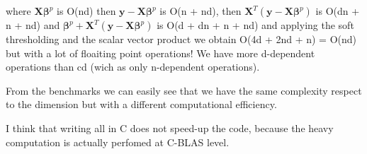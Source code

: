 \documentclass[a4paper,10pt]{article}
\newcommand{\bbeta}{\boldsymbol{\beta}}
\newcommand{\X}{\mathbf{X}}
\newcommand{\y}{\mathbf{y}}
\begin{document}
where $\X\bbeta^p$ is O(nd) then $\y - \X\bbeta^p$ is O(n + nd), 
then $\X^T(\y - \X\bbeta^p)$ is O(dn + n + nd) and 
$\bbeta^p + \X^T(\y - \X\bbeta^p)$ is O(d + dn + n + nd) and
applying the soft thresholding and the scalar vector product 
we obtain O(4d + 2nd + n) = O(nd) but with a lot of floaiting point
operations!
We have more d-dependent operations than cd (wich as only 
n-dependent operations).

From the benchmarks we can easily see that we have the same
complexity respect to the dimension but with a different computational
efficiency.

I think that writing all in C does not speed-up the code, because
the heavy computation is actually perfomed at C-BLAS level.
\end{document}
